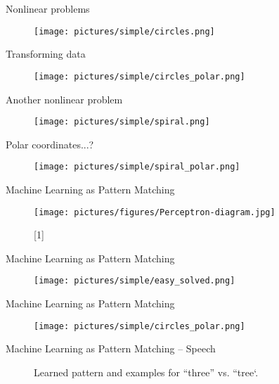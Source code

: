 \documentclass{beamer}
\begin{document}
\begin{frame}{Nonlinear problems}
\begin{figure}
\texttt{[image: pictures/simple/circles.png]}
\end{figure}
\end{frame}


\begin{frame}{Transforming data}
\begin{figure}
\texttt{[image: pictures/simple/circles\_polar.png]}
\end{figure}
\end{frame}


\begin{frame}{Another nonlinear problem}
\begin{figure}
\texttt{[image: pictures/simple/spiral.png]}
\end{figure}
\end{frame}


\begin{frame}{Polar coordinates...?}
\begin{figure}
\texttt{[image: pictures/simple/spiral\_polar.png]}
\end{figure}
\end{frame}


\begin{frame}{Machine Learning as Pattern Matching}
\begin{figure}
\texttt{[image: pictures/figures/Perceptron-diagram.jpg]}
\caption*{[1]}
\end{figure}
\end{frame}


\begin{frame}{Machine Learning as Pattern Matching}
\begin{figure}
\texttt{[image: pictures/simple/easy\_solved.png]}
\end{figure}
\end{frame}


\begin{frame}{Machine Learning as Pattern Matching}
\begin{figure}
\texttt{[image: pictures/simple/circles\_polar.png]}
\end{figure}
\end{frame}


\begin{frame}{Machine Learning as Pattern Matching -- Speech}
\begin{figure}
\hfil
{}
\caption*{Learned pattern and examples for ``three'' vs. ``tree`.}
\end{figure}
\end{frame}
\end{document}
